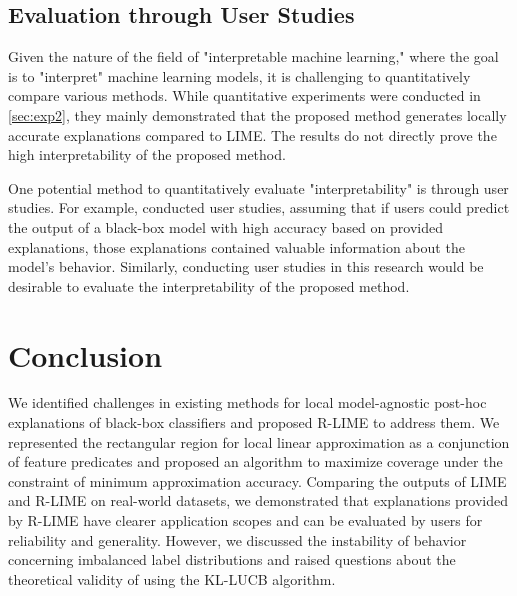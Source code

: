 \documentclass[runningheads]{llncs}
\begin{document}
\subsection{Evaluation through User Studies}
Given the nature of the field of "interpretable machine learning,"
where the goal is to "interpret" machine learning models,
it is challenging to quantitatively compare various methods.
While quantitative experiments were conducted in \cref{sec:exp2},
they mainly demonstrated that the proposed method generates
locally accurate explanations compared to LIME.
The results do not directly prove the high interpretability of the proposed method.

One potential method to quantitatively evaluate "interpretability" is through user studies. For example, \cite{ribeiro2018anchors} conducted user studies, assuming that if users could predict the output of a black-box model with high accuracy based on provided explanations, those explanations contained valuable information about the model's behavior. Similarly, conducting user studies in this research would be desirable to evaluate the interpretability of the proposed method.

\section{Conclusion}
We identified challenges in existing methods for local model-agnostic post-hoc
explanations of black-box classifiers and proposed R-LIME to address them.
We represented the rectangular region for local linear approximation as a
conjunction of feature predicates and proposed an algorithm to
maximize coverage under the constraint of minimum approximation accuracy.
Comparing the outputs of LIME and R-LIME on real-world datasets,
we demonstrated that explanations provided by R-LIME have clearer application
scopes and can be evaluated by users for reliability and generality.
However, we discussed the instability of behavior concerning imbalanced label
distributions and raised questions about the theoretical validity of using
the KL-LUCB algorithm.
\end{document}

